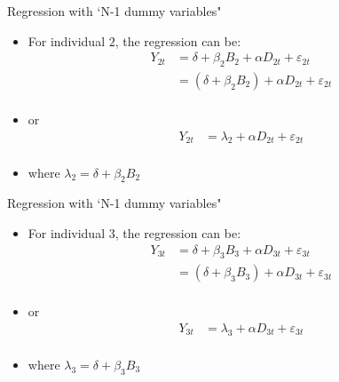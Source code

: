 \documentclass[dvipsnames,hyperref={pdfpagelabels=false}]{beamer}
\begin{document}
\begin{frame}{Regression with `N-1 dummy variables"}
	\begin{itemize} 
		\item For individual $2$, the regression can be: 	
		\begin{equation*}
			\begin{aligned}
				Y_{2t}&=\delta + \beta_{2} B_{2} + \alpha D_{2t}+\varepsilon_{2t}  \\
				&= (\delta + \beta_{2} B_{2}) + \alpha D_{2t}+\varepsilon_{2t}  \\
			\end{aligned}
		\end{equation*}
		
		\item[] or
		\begin{equation*}
			\begin{aligned}
				Y_{2t}&=\lambda_{2} + \alpha D_{2t}+\varepsilon_{2t}  \\
			\end{aligned}
		\end{equation*}
		\item where $\lambda_{2}=\delta + \beta_{2} B_{2}$	
	\end{itemize}
\end{frame}


\begin{frame}{Regression with `N-1 dummy variables"}
	\begin{itemize} 
		\item For individual $3$, the regression can be: 	
		\begin{equation*}
			\begin{aligned}
				Y_{3t}&=\delta + \beta_{3} B_{3} + \alpha D_{3t}+\varepsilon_{3t}  \\
				&= (\delta + \beta_{3} B_{3}) + \alpha D_{3t}+\varepsilon_{3t}  \\
			\end{aligned}
		\end{equation*}
		
		\item[] or
		\begin{equation*}
			\begin{aligned}
				Y_{3t}&=\lambda_{3} + \alpha D_{3t}+\varepsilon_{3t}  \\
			\end{aligned}
		\end{equation*}
		\item where $\lambda_{3}=\delta + \beta_{3} B_{3}$	
	\end{itemize}
\end{frame}
\end{document}

